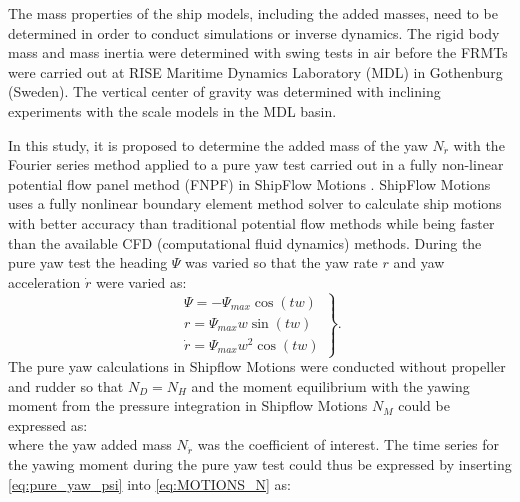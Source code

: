 \noindent The mass properties of the ship models, including the added masses, need to be determined in order to conduct simulations or inverse dynamics. The rigid body mass and mass inertia were determined with swing tests in air before the FRMTs were carried out at RISE Maritime Dynamics Laboratory (MDL) in Gothenburg (Sweden). The vertical center of gravity was determined with inclining experiments with the scale models in the MDL basin.

In this study, it is proposed to determine the added mass of the yaw $N_{\dot{r}}$ with the Fourier series method \citep{sakamotoURANSSimulationsStatic2012} applied to a pure yaw test carried out in a fully non-linear potential flow panel method (FNPF) in ShipFlow Motions \citep{kjellbergFullyNonlinearUnsteady2013}.
ShipFlow Motions uses a fully nonlinear boundary element method solver to calculate ship motions with better accuracy than traditional potential flow methods while being faster than the available CFD (computational fluid dynamics) methods.
During the pure yaw test the heading $\Psi$ was varied  so that the yaw rate $r$ and yaw acceleration $\dot{r}$ were varied as:
\begin{equation}
    \left.\begin{aligned}
    \Psi = - \Psi_{max} \cos{\left(t w \right)} \\
    r = \Psi_{max} w \sin{\left(t w \right)} \\
    \dot{r} = \Psi_{max} w^{2} \cos{\left(t w \right)}
    \end{aligned}\right\}.
    \label{eq:pure_yaw_psi}
\end{equation}
The pure yaw calculations in Shipflow Motions were conducted without propeller and rudder so that $N_D=N_H$ and the moment equilibrium with the yawing moment from the pressure integration in Shipflow Motions $N_M$ could be expressed as: 
\begin{equation}
    
    \label{eq:MOTIONS_N}
\end{equation}
where the yaw added mass $N_{\dot{r}}$ was the coefficient of interest. 
The time series for the yawing moment during the pure yaw test could thus be expressed by inserting \autoref{eq:pure_yaw_psi}  into \autoref{eq:MOTIONS_N} as:

